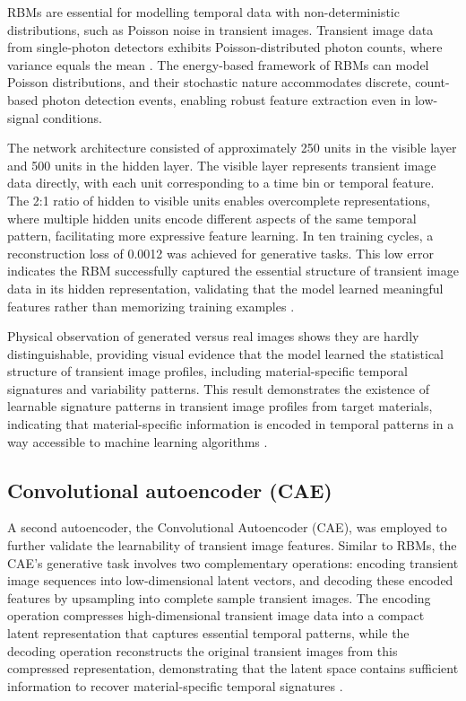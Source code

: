 \documentclass[12pt,a4paper,oneside]{report}
\begin{document}
RBMs are essential for modelling temporal data with non-deterministic distributions, such as Poisson noise in transient images. Transient image data from single-photon detectors exhibits Poisson-distributed photon counts, where variance equals the mean \cite{tontini2020}. The energy-based framework of RBMs can model Poisson distributions, and their stochastic nature accommodates discrete, count-based photon detection events, enabling robust feature extraction even in low-signal conditions.

The network architecture consisted of approximately 250 units in the visible layer and 500 units in the hidden layer. The visible layer represents transient image data directly, with each unit corresponding to a time bin or temporal feature. The 2:1 ratio of hidden to visible units enables overcomplete representations, where multiple hidden units encode different aspects of the same temporal pattern, facilitating more expressive feature learning. In ten training cycles, a reconstruction loss of 0.0012 was achieved for generative tasks. This low error indicates the RBM successfully captured the essential structure of transient image data in its hidden representation, validating that the model learned meaningful features rather than memorizing training examples \cite{ackley1985}.

Physical observation of generated versus real images shows they are hardly distinguishable, providing visual evidence that the model learned the statistical structure of transient image profiles, including material-specific temporal signatures and variability patterns. This result demonstrates the existence of learnable signature patterns in transient image profiles from target materials, indicating that material-specific information is encoded in temporal patterns in a way accessible to machine learning algorithms \cite{su2016,jungerman2022}.


\subsection{Convolutional autoencoder (CAE)}
\label{subsec:cae}

A second autoencoder, the Convolutional Autoencoder (CAE), was employed to further validate the learnability of transient image features. Similar to RBMs, the CAE's generative task involves two complementary operations: encoding transient image sequences into low-dimensional latent vectors, and decoding these encoded features by upsampling into complete sample transient images. The encoding operation compresses high-dimensional transient image data into a compact latent representation that captures essential temporal patterns, while the decoding operation reconstructs the original transient images from this compressed representation, demonstrating that the latent space contains sufficient information to recover material-specific temporal signatures \cite{ackley1985,su2016}.
\end{document}
